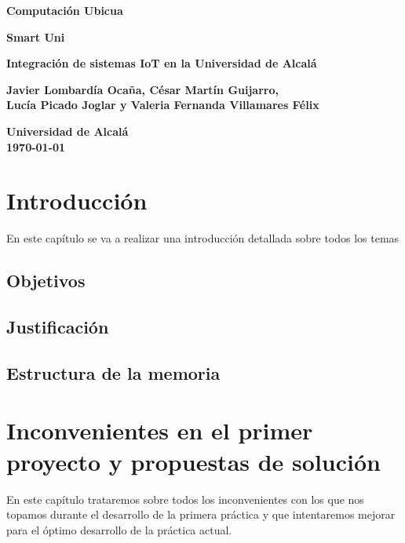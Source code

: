 \documentclass[12pt]{report}
\begin{document}
\begin{titlepage}
    \begin{center}
        \vspace*{1cm}
        
        \textbf{\huge Computación Ubicua}
        
        \vspace{0.5cm}
        \textbf{\large Smart Uni}
        
        \vspace{1.5cm}
        
        \textbf{\huge Integración de sistemas IoT en la Universidad de Alcalá}
        
        \vspace{2cm}
        
        \textbf{\large Javier Lombardía Ocaña, César Martín Guijarro,}\\
        \textbf{\large Lucía Picado Joglar y Valeria Fernanda Villamares Félix}
        
        \vfill
        
        \textbf{\large Universidad de Alcalá}\\
        \textbf{\large \today}
        
    \end{center}
\end{titlepage}


\tableofcontents



\chapter{Introducción}
En este capítulo se va a realizar una introducción detallada sobre todos los temas
\section{Objetivos}
\lipsum[1-2] %
\newpage
\section{Justificación}
\lipsum[3-4]
\newpage
\section{Estructura de la memoria}
\lipsum[5-6]

\chapter{Inconvenientes en el primer proyecto y propuestas de solución}
En este capítulo trataremos sobre todos los inconvenientes con los que nos topamos durante el desarrollo de la primera práctica y que intentaremos mejorar para el óptimo desarrollo de la práctica actual.
\end{document}
